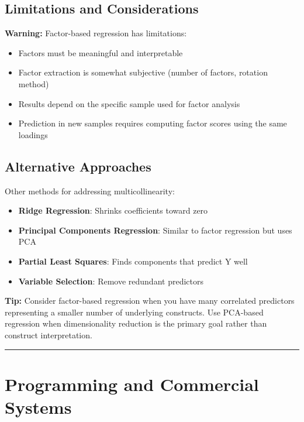 \documentclass[
]{article}
\begin{document}
\textbf{ }

\subsection{Limitations and Considerations}

\textbf{Warning: } Factor-based regression has limitations:

\begin{itemize}
\item
  Factors must be meaningful and interpretable
\item
  Factor extraction is somewhat subjective (number of factors, rotation
  method)
\item
  Results depend on the specific sample used for factor analysis
\item
  Prediction in new samples requires computing factor scores using the
  same loadings
\end{itemize}

\textbf{ }

\subsection{Alternative Approaches}

Other methods for addressing multicollinearity:

\begin{itemize}
\item
  \textbf{Ridge Regression}: Shrinks coefficients toward zero
\item
  \textbf{Principal Components Regression}: Similar to factor regression
  but uses PCA
\item
  \textbf{Partial Least Squares}: Finds components that predict Y well
\item
  \textbf{Variable Selection}: Remove redundant predictors
\end{itemize}

\textbf{Tip: } Consider factor-based regression when you have many
correlated predictors representing a smaller number of underlying
constructs. Use PCA-based regression when dimensionality reduction is
the primary goal rather than construct interpretation.

\begin{center}\rule{0.5\linewidth}{0.5pt}\end{center}

\textbf{ }

\section{Programming and Commercial Systems}
\end{document}
